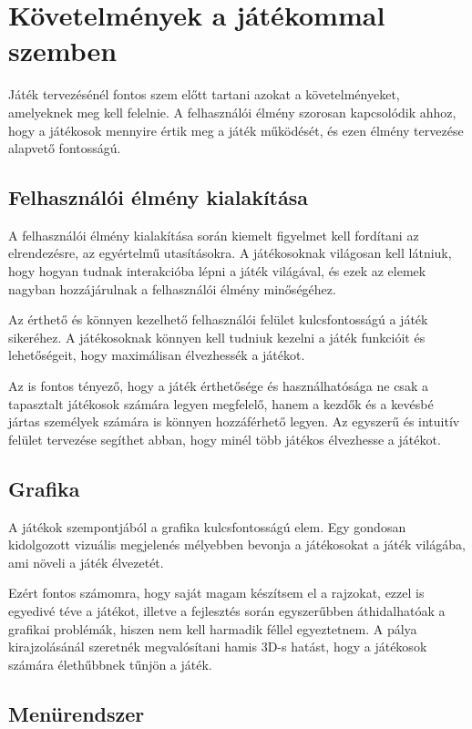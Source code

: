 \chapter{Követelmények a játékommal szemben}
\indent \indent Játék tervezésénél fontos szem előtt tartani azokat a követelményeket, amelyeknek meg kell felelnie. A felhasználói élmény szorosan kapcsolódik ahhoz, hogy a játékosok mennyire értik meg a játék működését, és ezen élmény tervezése alapvető fontosságú.


\section{Felhasználói élmény kialakítása}

\indent \indent A felhasználói élmény kialakítása során kiemelt figyelmet kell fordítani az elrendezésre, az egyértelmű utasításokra. A játékosoknak világosan kell látniuk, hogy hogyan tudnak interakcióba lépni a játék világával, és ezek az elemek nagyban hozzájárulnak a felhasználói élmény minőségéhez.

Az érthető és könnyen kezelhető felhasználói felület kulcsfontosságú a játék sikeréhez. A játékosoknak könnyen kell tudniuk kezelni a játék funkcióit és lehetőségeit, hogy maximálisan élvezhessék a játékot.

Az is fontos tényező, hogy a játék érthetősége és használhatósága ne csak a tapasztalt játékosok számára legyen megfelelő, hanem a kezdők és a kevésbé jártas személyek számára is könnyen hozzáférhető legyen. Az egyszerű és intuitív felület tervezése segíthet abban, hogy minél több játékos élvezhesse a játékot.


\section{Grafika}

\indent \indent A játékok szempontjából a grafika kulcsfontosságú elem. Egy gondosan kidolgozott vizuális megjelenés mélyebben bevonja a játékosokat a játék világába, ami növeli a játék élvezetét.

Ezért fontos számomra, hogy saját magam készítsem el a rajzokat, ezzel is egyedivé téve a játékot, illetve a fejlesztés során egyszerűbben áthidalhatóak a grafikai problémák, hiszen nem kell harmadik féllel egyeztetnem. A pálya kirajzolásánál szeretnék megvalósítani hamis 3D-s hatást, hogy a játékosok számára élethűbbnek tűnjön a játék. 


\section{Menürendszer}

